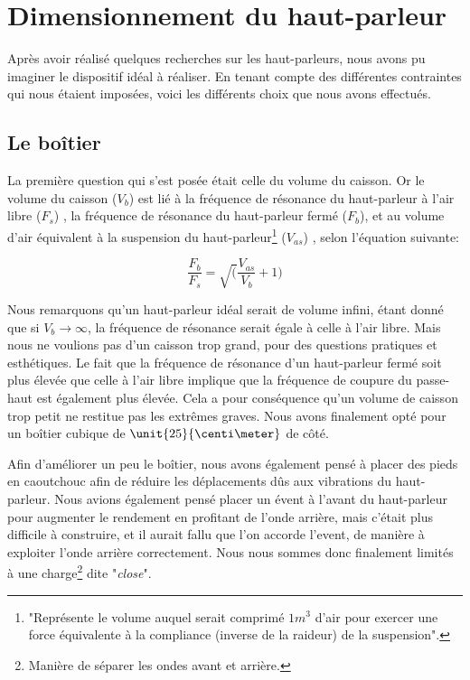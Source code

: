 




\section{Dimensionnement du haut-parleur}

Après avoir réalisé quelques recherches sur les haut-parleurs, nous avons pu imaginer le dispositif idéal
à réaliser. En tenant compte des différentes contraintes qui nous étaient imposées, voici les différents
choix que nous avons effectués.

\subsection{Le boîtier}
La première question qui s'est posée était celle du volume du caisson. Or le volume du caisson ($V_b$) est
lié à la fréquence de résonance du
haut-parleur à l'air libre ($F_s$) , la fréquence de résonance du haut-parleur fermé ($F_b$), et au volume
d'air équivalent à la suspension du haut-parleur\footnote{"Représente le volume auquel serait comprimé
$1m^{3}$ d'air pour exercer une force équivalente à la compliance (inverse de la raideur) de la suspension"\cite{Vas}.}
($V_{as}$) , selon l'équation suivante\cite{Vas}:

$$\frac{F_b}{F_s} = \sqrt(\frac{V_{as}}{V_b} +1)$$

Nous remarquons qu'un haut-parleur idéal serait de volume infini, étant donné que si $V_b\rightarrow \infty$, la fréquence de résonance serait égale à celle à l'air libre. Mais nous ne voulions pas d'un caisson trop grand, pour des questions pratiques et esthétiques.
Le fait que la fréquence de résonance d'un haut-parleur fermé soit plus élevée que celle à l'air libre implique que
la fréquence de coupure du passe-haut est également plus élevée. Cela a pour conséquence
qu'un volume de caisson trop petit ne restitue pas les extrêmes graves. Nous avons finalement opté pour un boîtier
cubique de $\unit{25}{\centi\meter}$ de côté.

Afin d'améliorer un peu le boîtier, nous avons également pensé à placer des pieds en caoutchouc afin de
réduire les déplacements dûs aux vibrations du haut-parleur. Nous avions également pensé placer un évent à l'avant du haut-parleur
pour augmenter le rendement en profitant de l'onde arrière, mais c'était plus difficile à construire, et
il aurait fallu que l'on accorde l'event, de manière à exploiter l'onde arrière correctement. Nous nous
sommes donc finalement limités à une charge\footnote{Manière de séparer les ondes avant et arrière.} dite
"\textit{close}"\cite{close}.


